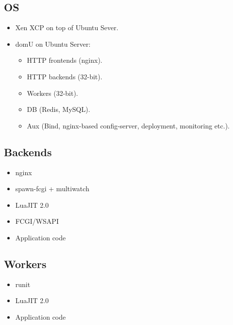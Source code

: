 \documentclass[aspectratio=169,handout,bigger]{beamer}
\begin{document}

\subsection*{OS}

\begin{frame}
  \begin{itemize}
    \item Xen XCP on top of Ubuntu Sever.
    \item domU on Ubuntu Server:
    \begin{itemize}
      \item HTTP frontends (nginx).
      \item HTTP backends (32-bit).
      \item Workers (32-bit).
      \item DB (Redis, MySQL).
      \item Aux (Bind, nginx-based config-server, deployment, monitoring etc.).
    \end{itemize}
  \end{itemize}
\end{frame}


\subsection*{Backends}

\begin{frame}
  \begin{itemize}
    \item nginx
    \item spawn-fcgi + multiwatch
    \item LuaJIT 2.0
    \item FCGI/WSAPI
    \item Application code
  \end{itemize}
\end{frame}


\subsection*{Workers}

\begin{frame}
  \begin{itemize}
    \item runit
    \item LuaJIT 2.0
    \item Application code
  \end{itemize}
\end{frame}
\end{document}
